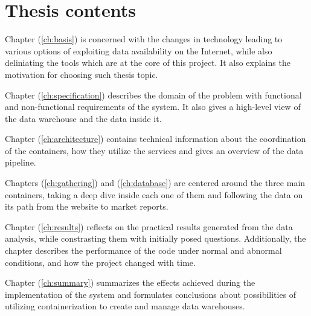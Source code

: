 \section{Thesis contents}
Chapter (\ref{ch:basis}) is concerned with the changes in technology leading to various options of exploiting data availability on the Internet, while also deliniating the tools which are at the core of this project. It also explains the motivation for choosing such thesis topic. \par
Chapter (\ref{ch:specification}) describes the domain of the problem with functional and non-functional requirements of the system. It also gives a high-level view of the data warehouse and the data inside it. \par
Chapter (\ref{ch:architecture}) contains technical information about the coordination of the containers, how they utilize the services and gives an overview of the data pipeline. \par
Chapters (\ref{ch:gathering}) and (\ref{ch:database}) are centered around the three main containers, taking a deep dive inside each one of them and following the data on its path from the website to market reports. \par
Chapter (\ref{ch:results}) reflects on the practical results generated from the data analysis, while constrasting them with initially posed questions. Additionally, the chapter describes the performance of the code under normal and abnormal conditions, and how the project changed with time. \par
Chapter (\ref{ch:summary}) summarizes the effects achieved during the implementation of the system and formulates conclusions about possibilities of utilizing containerization to create and manage data warehouses.